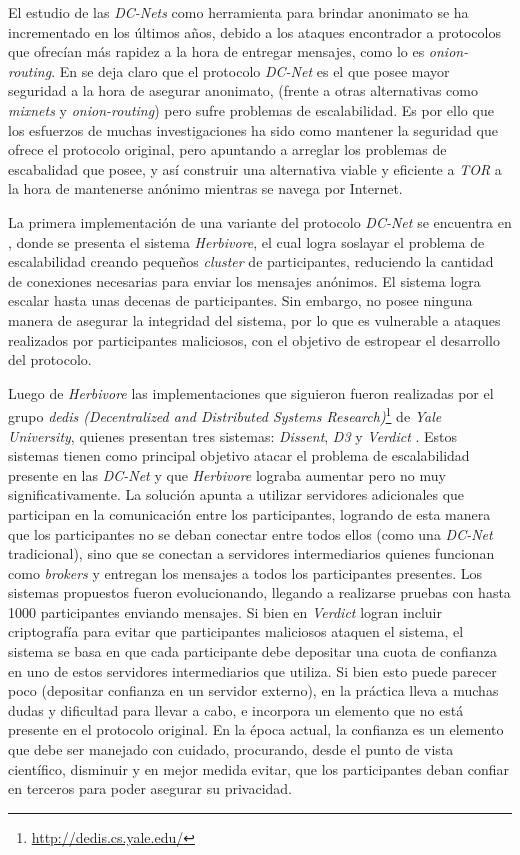 El estudio de las \emph{DC-Nets} como herramienta para brindar anonimato se ha incrementado en los últimos años, debido a los ataques 
encontrador a protocolos que ofrecían más rapidez a la hora de entregar mensajes, como lo es \emph{onion-routing}. En 
\cite{wright2002analysis} se deja claro que el protocolo \emph{DC-Net} es el que posee mayor seguridad a la hora de asegurar anonimato, 
(frente a otras alternativas como \emph{mixnets} y \emph{onion-routing})
pero sufre problemas de escalabilidad. Es por ello que los esfuerzos de muchas investigaciones ha sido como mantener la 
seguridad que ofrece el protocolo original, pero apuntando a arreglar los problemas de escabalidad que posee, y así construir 
una alternativa viable y eficiente a \emph{TOR} a la hora de mantenerse anónimo mientras se navega por Internet.

La primera implementación de una variante del protocolo \emph{DC-Net} se encuentra en \cite{goel2003herbivore}, donde se presenta el 
sistema \emph{Herbivore}, el cual logra soslayar el problema de escalabilidad creando pequeños \emph{cluster} de participantes, 
reduciendo la cantidad de conexiones necesarias para enviar los mensajes anónimos. El sistema logra escalar hasta unas decenas 
de participantes. Sin embargo, no posee ninguna manera de asegurar la integridad del sistema, por lo que es vulnerable a 
ataques realizados por participantes maliciosos, con el objetivo de estropear el desarrollo del protocolo.

Luego de \emph{Herbivore} las implementaciones que siguieron fueron realizadas por el grupo 
\emph{dedis (Decentralized and Distributed Systems Research)}\footnote{\url{http://dedis.cs.yale.edu/}} de \emph{Yale University}, 
quienes presentan tres sistemas: \emph{Dissent}, \emph{D3} y \emph{Verdict} 
\cite{corrigan2010dissent, wolinsky2012dissent, wolinsky2012scalable, corrigan2012proactively}. Estos sistemas tienen como principal 
objetivo atacar el problema de escalabilidad presente en las \emph{DC-Net} y que \emph{Herbivore} lograba aumentar pero no muy 
significativamente. La solución apunta a utilizar servidores adicionales que participan 
en la comunicación entre los participantes, logrando de esta manera que los participantes no se 
deban conectar entre todos ellos (como una \emph{DC-Net} tradicional), 
sino que se conectan a servidores intermediarios quienes funcionan como \emph{brokers} y entregan los mensajes a todos los participantes 
presentes. Los sistemas propuestos fueron evolucionando, llegando a realizarse pruebas con hasta 1000 participantes enviando mensajes. 
Si bien en \emph{Verdict} logran incluir criptografía para evitar que participantes maliciosos 
ataquen el sistema, el sistema se basa en que cada participante debe depositar una cuota de 
confianza en uno de estos servidores intermediarios que utiliza. Si bien esto puede parecer poco 
(depositar confianza en un servidor externo), en la práctica lleva a muchas dudas y dificultad 
para llevar a cabo, e incorpora un elemento que no está presente en el protocolo original. 
En la época actual, la confianza es un elemento que debe ser manejado con cuidado, procurando, 
desde el punto de vista científico, disminuir y en mejor medida evitar, que los participantes 
deban confiar en terceros para poder asegurar su privacidad. 

